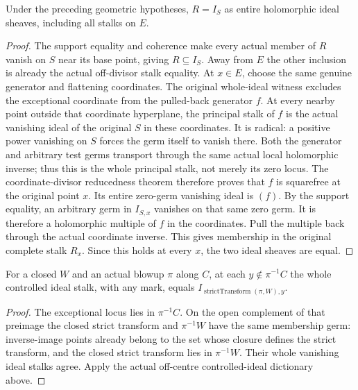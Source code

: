 \begin{theorem}
\label{hir:invertible-reduced-ideal-across-smooth-divisor}
\leanok
Under the preceding geometric hypotheses, $R=I_S$ as entire holomorphic
ideal sheaves, including all stalks on $E$.
\end{theorem}
\begin{proof}
The support equality and coherence make every actual member of $R$ vanish
on $S$ near its base point, giving $R\subseteq I_S$.  Away from $E$ the
other inclusion is already the actual off-divisor stalk equality.
At $x\in E$, choose the same genuine generator and flattening coordinates.
The original whole-ideal witness excludes the exceptional coordinate from
the pulled-back generator $f$.  At every nearby point outside that
coordinate hyperplane, the principal stalk of $f$ is the actual vanishing
ideal of the original $S$ in these coordinates.  It is radical: a positive
power vanishing on $S$ forces the germ itself to vanish there.
Both the generator and arbitrary test germs transport through the same
actual local holomorphic inverse; thus this is the whole principal stalk,
not merely its zero locus.  The coordinate-divisor reducedness theorem
therefore proves that $f$ is squarefree at the original point $x$.
Its entire zero-germ vanishing ideal is $(f)$.  By the support equality,
an arbitrary germ in $I_{S,x}$ vanishes on that same zero germ.  It is
therefore a holomorphic multiple of $f$ in the coordinates.  Pull the
multiple back through the actual coordinate inverse.  This gives membership
in the original complete stalk $R_x$.  Since this holds at every $x$, the
two ideal sheaves are equal.
\end{proof}

\begin{lemma}
\label{hir:controlled-hypersurface-off-centre-strict-stalk}
\leanok
For a closed $W$ and an actual blowup $\pi$ along $C$, at each
$y\notin\pi^{-1}C$ the whole controlled ideal stalk, with any mark,
equals $I_{\operatorname{strictTransform}(\pi,W),y}$.
\end{lemma}
\begin{proof}
The exceptional locus lies in $\pi^{-1}C$.  On the open complement of
that preimage the closed strict transform and $\pi^{-1}W$ have the same
membership germ: inverse-image points already belong to the set whose
closure defines the strict transform, and the closed strict transform
lies in $\pi^{-1}W$.  Their whole vanishing ideal stalks agree.  Apply
the actual off-centre controlled-ideal dictionary above.
\end{proof}

